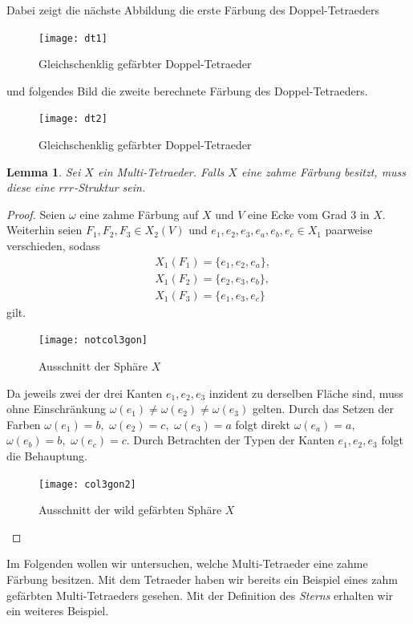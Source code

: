 \documentclass[12pt,titlepage,twoside,cleardoublepage]{article}
\theoremstyle{nummermitklammern}
\newtheorem{lemma}[temp]{Lemma}
\newtheorem{lemma}[zahl]{Lemma}
\numberwithin{equation}{section}
\begin{document}
Dabei zeigt die nächste Abbildung die erste Färbung des Doppel-Tetraeders 
\begin{figure}[H]
\begin{center}
\texttt{[image: dt1]}
\end{center}
\caption{Gleichschenklig gefärbter Doppel-Tetraeder}
\end{figure}
und folgendes Bild die zweite berechnete Färbung des Doppel-Tetraeders.
\begin{figure}[H]
\begin{center}
\texttt{[image: dt2]}
\end{center}
\caption{Gleichschenklig gefärbter Doppel-Tetraeder}
\end{figure}
\begin{lemma}
Sei $X$ ein Multi-Tetraeder. Falls $X$ eine zahme Färbung besitzt, muss diese eine $rrr$-Struktur sein.
\end{lemma}
\begin{proof}
Seien $\omega$ eine zahme Färbung auf $X$ und $V$ eine Ecke vom Grad 3 in $X.$ Weiterhin seien $F_1,F_2,F_3\in X_2(V)$ und $e_1,e_2,e_3,e_a,e_b,e_c\in X_1$ paarweise verschieden, sodass 
\begin{align*}
&X_1(F_1)=\{e_1,e_2,e_a\},\\
&X_1(F_2)=\{e_2,e_3,e_b\}, \\
&X_1(F_3)=\{e_1,e_3,e_c\}
\end{align*}
gilt.
\begin{figure}[H]
\begin{center}
\texttt{[image: notcol3gon]}
\end{center}
\caption{Ausschnitt der Sphäre $X$}
\end{figure}
Da jeweils zwei der drei Kanten $e_1,e_2,e_3$ inzident zu derselben Fläche sind, muss ohne Einschränkung $\omega(e_1)\neq\omega(e_2)\neq\omega(e_3)$ gelten. Durch das Setzen der Farben $\omega(e_1)=b,$ $\omega(e_2)=c,$ $\omega(e_3)=a$ folgt direkt $\omega(e_a)=a,$ $\omega(e_b)=b,$ $\omega(e_c)=c.$  Durch Betrachten der Typen der Kanten $e_1,e_2,e_3$ folgt die Behauptung.
\begin{figure}[H]
\begin{center}
\texttt{[image: col3gon2]}
\end{center}
\caption{Ausschnitt der wild gefärbten Sphäre $X$}
\end{figure}
\end{proof}
Im Folgenden wollen wir untersuchen, welche Multi-Tetraeder eine zahme Färbung besitzen. Mit dem Tetraeder haben wir bereits ein Beispiel eines zahm gefärbten Multi-Tetraeders gesehen. Mit der Definition des \emph{Sterns} erhalten wir ein weiteres Beispiel.
\end{document}
